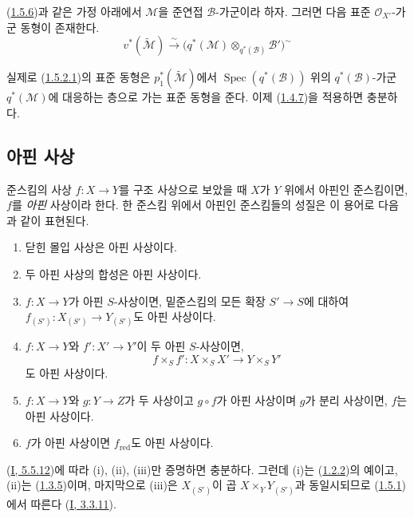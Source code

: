 \begin{env}[1.5.7]
\label{II.1.5.7-ko}
(\hyperref[II.1.5.6-ko]{1.5.6})과 같은 가정 아래에서 $\mathcal{M}$을
준연접 $\mathcal{B}$-가군이라 하자. 그러면 다음 표준
$\mathcal{O}_{X'}$-가군 동형이 존재한다.
\[
  v^*(\widetilde{\mathcal{M}})\xrightarrow{\sim}
  \bigl(q^*(\mathcal{M})\otimes_{q^*(\mathcal{B})}\mathcal{B}'\bigr)^{\sim}
  \tag{1.5.7.1}\label{II.1.5.7.1-ko}
\]

실제로 (\hyperref[II.1.5.2.1-ko]{1.5.2.1})의 표준 동형은
$p_1^*(\widetilde{\mathcal{M}})$에서
$\operatorname{Spec}(q^*(\mathcal{B}))$ 위의
$q^*(\mathcal{B})$-가군 $q^*(\mathcal{M})$에 대응하는 층으로 가는
표준 동형을 준다. 이제 (\hyperref[II.1.4.7-ko]{1.4.7})을 적용하면
충분하다.
\end{env}

\subsection{아핀 사상}
\label{II.1.6-ko}

\begin{env}[1.6.1]
\label{II.1.6.1-ko}
준스킴의 사상 $f:X\to Y$를 구조 사상으로 보았을 때 $X$가 $Y$ 위에서
아핀인 준스킴이면, $f$를 \emph{아핀} 사상이라 한다. 한 준스킴 위에서
아핀인 준스킴들의 성질은 이 용어로 다음과 같이 표현된다.
\end{env}

\begin{proposition}[1.6.2]
\label{II.1.6.2-ko}
\begin{enumerate}
  \item[\rm(i)] 닫힌 몰입 사상은 아핀 사상이다.
  \item[\rm(ii)] 두 아핀 사상의 합성은 아핀 사상이다.
  \item[\rm(iii)] $f:X\to Y$가 아핀 $S$-사상이면, 밑준스킴의 모든 확장
    $S'\to S$에 대하여 $f_{(S')}:X_{(S')}\to Y_{(S')}$도 아핀 사상이다.
  \item[\rm(iv)] $f:X\to Y$와 $f':X'\to Y'$이 두 아핀 $S$-사상이면,
    \[
      f\times_S f':X\times_S X'\to Y\times_S Y'
    \]
    도 아핀 사상이다.
  \item[\rm(v)] $f:X\to Y$와 $g:Y\to Z$가 두 사상이고 $g\circ f$가
    아핀 사상이며 $g$가 분리 사상이면, $f$는 아핀 사상이다.
  \item[\rm(vi)] $f$가 아핀 사상이면 $f_{\mathrm{red}}$도 아핀 사상이다.
\end{enumerate}
\end{proposition}

(\hyperref[I.5.5.12-ko]{I, 5.5.12})에 따라 (i), (ii), (iii)만 증명하면
충분하다. 그런데 (i)는 (\hyperref[II.1.2.2-ko]{1.2.2})의 예이고,
(ii)는 (\hyperref[II.1.3.5-ko]{1.3.5})이며, 마지막으로 (iii)은
$X_{(S')}$이 곱 $X\times_Y Y_{(S')}$과 동일시되므로
(\hyperref[II.1.5.1-ko]{1.5.1})에서 따른다
(\hyperref[I.3.3.11-ko]{I, 3.3.11}).

